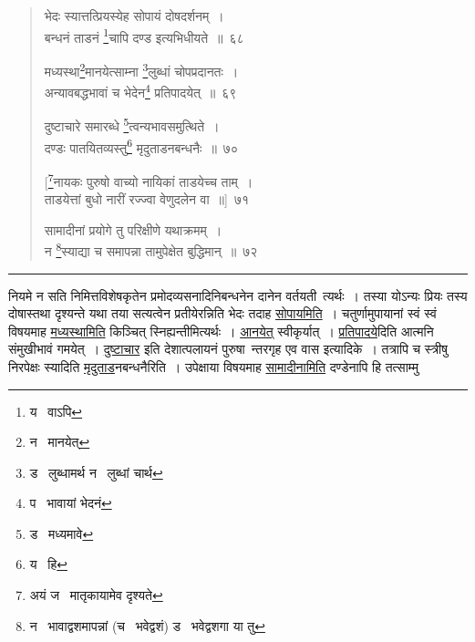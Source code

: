 \documentclass[11pt, openany]{book}
\begin{document}
\newpage

\begin{quote}
{\na भेदः स्यात्तत्प्रियस्येह सोपायं दोषदर्शनम्~।\\
बन्धनं ताडनं \renewcommand{\thefootnote}{1}\footnote{य \textendash\  वाऽपि}चापि दण्ड इत्यभिधीयते~॥~६८

मध्यस्था\renewcommand{\thefootnote}{2}\footnote{न \textendash\  मानयेत्}मानयेत्साम्ना \renewcommand{\thefootnote}{3}\footnote{ड \textendash\  लुब्धामर्थ न \textendash\  लुब्धां चार्थ}लुब्धां चोपप्रदानतः~।\\
अन्यावबद्धभावां च भेदेन\renewcommand{\thefootnote}{4}\footnote{प \textendash\  भावायां भेदनं} प्रतिपादयेत्~॥~६९

दुष्टाचारे समारब्धे \renewcommand{\thefootnote}{5}\footnote{ड \textendash\  मध्यमावे}त्वन्यभावसमुत्थिते~।\\
दण्डः पातयितव्यस्तु\renewcommand{\thefootnote}{6}\footnote{य \textendash\  हि} मृदुताडनबन्धनैः~॥~७०

[\renewcommand{\thefootnote}{7}\footnote{अयं ज \textendash\  मातृकायामेव दृश्यते}नायकः पुरुषो वाच्यो नायिकां ताडयेच्च ताम्~।\\
ताडयेत्तां बुधो नारीं रज्ज्वा वेणुदलेन वा~॥]~७१

सामादीनां प्रयोगे तु परिक्षीणे यथाक्रमम्~।\\
न \renewcommand{\thefootnote}{8}\footnote{न \textendash\  भावाद्वशमापन्नां (च \textendash\  भवेद्वशं) ड \textendash\  भवेद्वशगा या तु}स्याद्या च समापन्ना तामुपेक्षेत बुद्धिमान्~॥~७२}
\end{quote}

\hrule

\vspace{2mm}
\noindent
नियमे न सति निमित्तविशेषकृतेन प्रमोदव्यसनादिनिबन्धनेन दानेन वर्तयती\textendash\ त्यर्थः~। तस्या योऽन्यः प्रियः तस्य दोषास्तथा दृश्यन्ते यथा तया सत्यत्वेन प्रतीयेरन्निति भेदः तदाह \underline{सोपायमिति}~। चतुर्णामुपायानां स्वं स्वं विषयमाह \underline{मध्यस्थामिति} किञ्चित् स्निह्यन्तीमित्यर्थः~। \underline{आनयेत्} स्वीकृर्यात्~। \underline{प्रतिपादये}दिति आत्मनि संमुखीभावं गमयेत्~। \underline{दुष्टाचार} इति देशात्पलायनं पुरुषा\textendash\ न्तरगृह एव वास इत्यादिके~। तत्रापि च स्त्रीषु निरपेक्षः स्यादिति \underline{मृदुताड}नबन्धनैरिति~। उपेक्षाया विषयमाह \underline{सामादीनामिति} दण्डेनापि हि तत्साम्मु\textendash

\newpage
\end{document}
